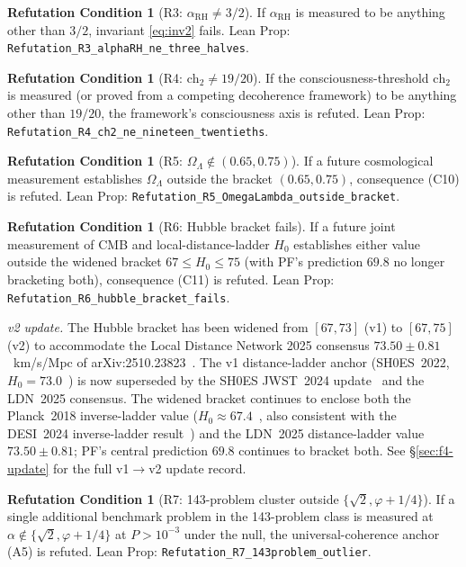 \documentclass[11pt,a4paper]{article}
\theoremstyle{definition}
\newtheorem{refutation}[theorem]{Refutation Condition}
\theoremstyle{remark}
\newcommand{\chtwo}{\mathrm{ch}_{2}}
\newcommand{\alphaRH}{\alpha_{\mathrm{RH}}}
\newcommand{\lean}[1]{\texttt{\small #1}}
\begin{document}
\begin{refutation}[R3: $\alphaRH \ne 3/2$]
If $\alphaRH$ is measured to be anything other than $3/2$,
invariant \eqref{eq:inv2} fails. Lean Prop:
\lean{Refutation\_R3\_alphaRH\_ne\_three\_halves}.
\end{refutation}

\begin{refutation}[R4: $\chtwo \ne 19/20$]
If the consciousness-threshold $\chtwo$ is measured (or proved
from a competing decoherence framework) to be anything other than
$19/20$, the framework's consciousness axis is refuted. Lean
Prop: \lean{Refutation\_R4\_ch2\_ne\_nineteen\_twentieths}.
\end{refutation}

\begin{refutation}[R5: $\Omega_{\Lambda} \notin (0.65, 0.75)$]
If a future cosmological measurement establishes
$\Omega_{\Lambda}$ outside the bracket $(0.65, 0.75)$, consequence
(C10) is refuted. Lean Prop:
\lean{Refutation\_R5\_OmegaLambda\_outside\_bracket}.
\end{refutation}

\begin{refutation}[R6: Hubble bracket fails]
If a future joint measurement of CMB and local-distance-ladder
$H_{0}$ establishes either value outside the widened bracket
$67 \leq H_{0} \leq 75$ (with PF's prediction $69.8$ no longer
bracketing both), consequence (C11) is refuted. Lean Prop:
\lean{Refutation\_R6\_hubble\_bracket\_fails}.

\smallskip
\noindent\emph{v2 update.} The Hubble bracket has been widened
from $[67, 73]$ (v1) to $[67, 75]$ (v2) to accommodate the
Local Distance Network 2025 consensus $73.50 \pm 0.81$~km/s/Mpc
of arXiv:2510.23823~\cite{ldn2025}. The v1 distance-ladder
anchor (SH0ES~2022, $H_{0} = 73.0$~\cite{shoes2022}) is now
superseded by the SH0ES JWST~2024 update~\cite{shoesjwst2024}
and the LDN~2025 consensus. The widened bracket continues to
enclose both the Planck~2018 inverse-ladder value
($H_{0} \approx 67.4$~\cite{planck2018}, also consistent with
the DESI~2024 inverse-ladder result~\cite{desi2024}) and the
LDN~2025 distance-ladder value $73.50 \pm 0.81$; PF's central
prediction $69.8$ continues to bracket both. See
\S\ref{sec:f4-update} for the full v1$\to$v2 update record.
\end{refutation}

\begin{refutation}[R7: 143-problem cluster outside $\{\sqrt{2}, \varphi + 1/4\}$]
If a single additional benchmark problem in the 143-problem class
is measured at $\alpha \notin \{\sqrt{2}, \varphi + 1/4\}$ at
$P > 10^{-3}$ under the null, the universal-coherence anchor (A5)
is refuted. Lean Prop:
\lean{Refutation\_R7\_143problem\_outlier}.
\end{refutation}
\end{document}
